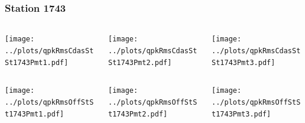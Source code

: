 \documentclass[aspectratio=169]{beamer}
\begin{document}
\begin{frame} 
  \frametitle{Station 1743}
  \begin{center}
    \begin{columns}
      \begin{column}{0.33\textwidth}
        \texttt{[image: ../plots/qpkRmsCdasStSt1743Pmt1.pdf]}
      \end{column}
      \begin{column}{0.33\textwidth}
        \texttt{[image: ../plots/qpkRmsCdasStSt1743Pmt2.pdf]}
      \end{column}
      \begin{column}{0.33\textwidth}
        \texttt{[image: ../plots/qpkRmsCdasStSt1743Pmt3.pdf]}
      \end{column}
    \end{columns}
  \end{center}

  \begin{center}
    \begin{columns}
      \begin{column}{0.33\textwidth}
        \texttt{[image: ../plots/qpkRmsOffStSt1743Pmt1.pdf]}
      \end{column}
      \begin{column}{0.33\textwidth}
        \texttt{[image: ../plots/qpkRmsOffStSt1743Pmt2.pdf]}
      \end{column}
      \begin{column}{0.33\textwidth}
        \texttt{[image: ../plots/qpkRmsOffStSt1743Pmt3.pdf]}
      \end{column}
    \end{columns}
  \end{center}
\end{frame}
\end{document}
